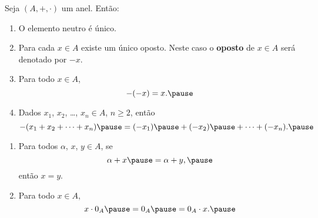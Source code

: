 \documentclass{beamer}
\begin{document}
    \begin{frame}
        \begin{proposicao}
            Seja $(A, + , \cdot)$ um anel. \pause Ent\~ao:\pause
            \begin{enumerate}[label={\roman*})]
                \item O elemento neutro {\'e} {\'u}nico.\pause

                \vspace{.5cm}

                \item Para cada $x \in A$ \pause existe um {\'u}nico
                    oposto. \pause Neste caso o \textbf{oposto} de
                    $x \in A$ \pause ser\'a denotado por $-x$.\pause

                \vspace{.5cm}

                \item Para todo $x \in A$, \pause
                \[
                    -(-x) = x.\pause
                \]

                \vspace{.5cm}

                \item Dados $x_{1}$, \pause $x_{2}$, \pause \dots,
                    $x_n \in A$, \pause $n \geqslant 2$, \pause
                    ent{\~a}o\pause
                \[
                    -(x_1 + x_2 + \dots + x_n) \pause = (-x_1) \pause
                    + (-x_2) \pause + \dots + (-x_n).\pause
                \]

                \vspace{.2cm}

                \seti
            \end{enumerate}
        \end{proposicao}
    \end{frame}

    \begin{frame}
        \begin{proposicao}
            \begin{enumerate}[label={\roman*})]
                \conti

                \item Para todos $\alpha$, \pause $x$, \pause $y \in A$, \pause se
                \[
                    \alpha + x \pause = \alpha + y,\pause
                \]
                ent{\~a}o $x = y$.\pause

                \vspace{.5cm}

                \item Para todo $x \in A$, \pause
                \[
                    x\cdot 0_A \pause = 0_A \pause = 0_A\cdot x.\pause
                \]

                \vspace{.5cm}
            \end{enumerate}
        \end{proposicao}
    \end{frame}
\end{document}
